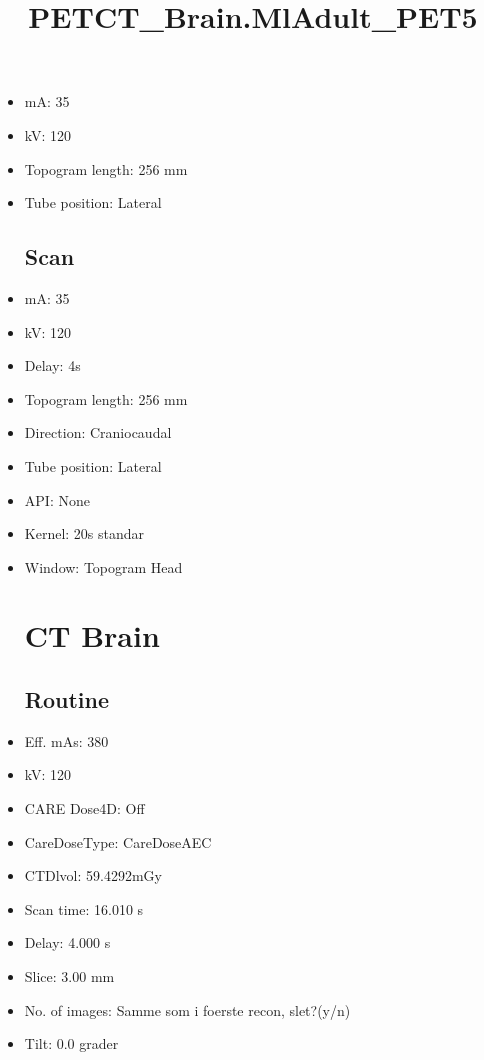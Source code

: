 \documentclass[12pt]{article}
\title{PETCT\_Brain.MlAdult\_PET5}
\begin{document}
\maketitle
\newpage
\tableofcontents
\newpage
{}


\begin{itemize}\section{Topogram}
\subsection{Routine}
\item mA: 35\item kV: 120\item Topogram length: 256 mm\item Tube position: Lateral
\subsection{Scan}\item mA: 35\item kV: 120\item Delay: 4s\item Topogram length: 256 mm\item Direction: Craniocaudal\item Tube position: Lateral\item API: None\item Kernel: 20s standar\item Window: Topogram Head
\section{CT Brain}
\subsection{Routine}
\item Eff. mAs: 380\item kV: 120\item CARE Dose4D: Off\item CareDoseType: CareDoseAEC\item CTDlvol: 59.4292mGy\item Scan time: 16.010 s\item Delay: 4.000 s\item Slice: 3.00 mm\item No. of images: Samme som i foerste recon, slet?(y/n)\item Tilt: 0.0 grader

\end{itemize}
\end{document}
